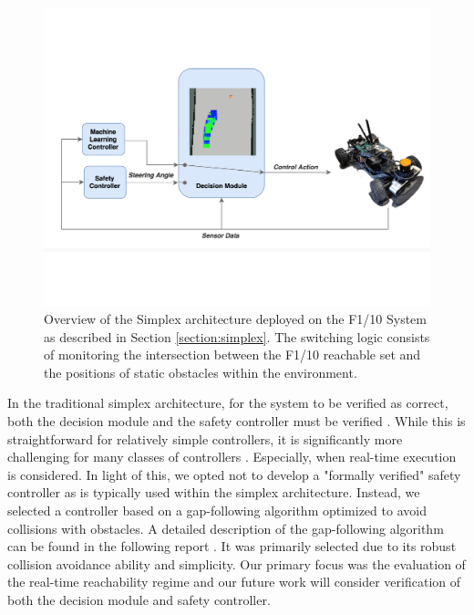 \documentclass[manuscript,screen,review]{acmart}
\newcommand{\todo}[1]{\textcolor{red}{\textbf{\underline{TODO:}} #1}}
\begin{document}

\begin{figure}[htbp]%
  \centering
  \includegraphics[width=0.7\linewidth]{figures/simplex_real.pdf}
  \caption{Overview of the Simplex architecture deployed on the F1/10 System as described in Section \ref{section:simplex}. The switching logic consists of monitoring the intersection between the F1/10 reachable set and the positions of static obstacles within the environment.}
  \label{fig:simplex_arch}
\end{figure}%


In the traditional simplex architecture, for the system to be verified as correct, both the decision module and the safety controller must be verified \cite{Mehmood2021}. While this is straightforward for relatively simple controllers, it is significantly more challenging for many classes of controllers \cite{ivanov2020case}. Especially, when real-time execution is considered. In light of this, we opted not to develop a "formally verified" safety controller as is typically used within the simplex architecture. Instead, we selected a controller based on a gap-following algorithm optimized to avoid collisions with obstacles. A detailed description of the gap-following algorithm can be found in the following report \cite{otterness_2019}. It was primarily selected due to its robust collision avoidance ability and simplicity. Our primary focus was the evaluation of the real-time reachability regime and our future work will consider verification of both the decision module and safety controller. 
\end{document}

